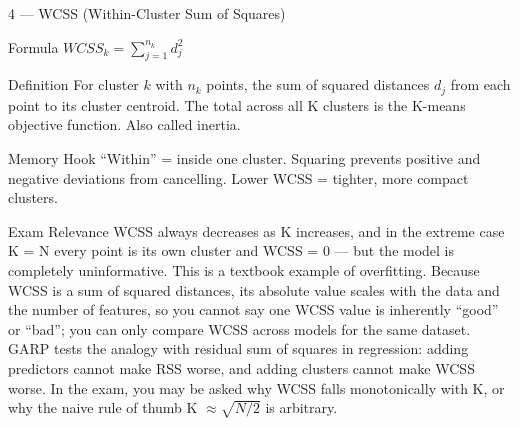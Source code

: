 \documentclass[aspectratio=169,8pt]{beamer}
\begin{document}
	\begin{frame}{4 --- WCSS (Within-Cluster Sum of Squares)}
		\begin{block}{Formula}
			$WCSS_k = \sum_{j=1}^{n_k} d_j^2$
		\end{block}
		\begin{block}{Definition}
			For cluster $k$ with $n_k$ points, the sum of squared distances $d_j$ from each point to its cluster centroid. The total across all K clusters is the K-means objective function. Also called inertia.
		\end{block}
		\begin{block}{Memory Hook}
			``Within'' = inside one cluster. Squaring prevents positive and negative deviations from cancelling. Lower WCSS = tighter, more compact clusters.
		\end{block}
		\begin{block}{Exam Relevance}
			WCSS always decreases as K increases, and in the extreme case K = N every point is its own cluster and WCSS = 0 --- but the model is completely uninformative. This is a textbook example of overfitting. Because WCSS is a sum of squared distances, its absolute value scales with the data and the number of features, so you cannot say one WCSS value is inherently ``good'' or ``bad''; you can only compare WCSS across models for the same dataset. GARP tests the analogy with residual sum of squares in regression: adding predictors cannot make RSS worse, and adding clusters cannot make WCSS worse. In the exam, you may be asked why WCSS falls monotonically with K, or why the naive rule of thumb K $\approx \sqrt{N/2}$ is arbitrary.
		\end{block}
	\end{frame}
	
\end{document}
